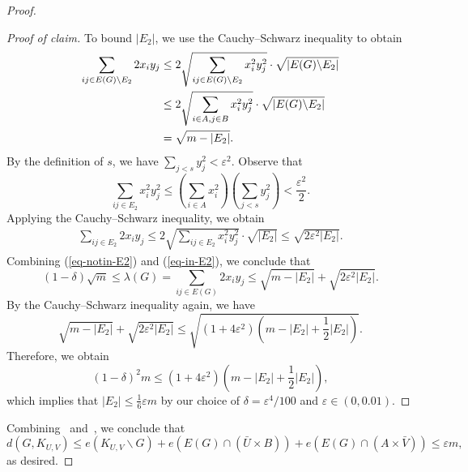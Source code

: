 \documentclass[10pt,a4paper]{amsart}
\newcommand*{\abs}[1]{\lvert#1\rvert}
\newenvironment{poc}{\begin{proof}[Proof of claim]\renewcommand*{\qedsymbol}{$\blacksquare$}}{\end{proof}}
\begin{document}
\begin{proof}
\begin{poc}
        To bound $|E_2|$, we use the Cauchy--Schwarz inequality to obtain
        \begin{align}
       \notag \sum_{ij \in E(G) \backslash E_2} 2x_i y_j  & \leq 2 \sqrt{\sum_{ij \in E(G) \backslash E_2} x_i^2 y_j^2} \cdot \sqrt{ |E(G) \backslash E_2| } \\ 
        & \leq 2 \sqrt{\sum_{i \in A, j \in B} x_i^2 y_j^2} \cdot \sqrt{|E(G) \backslash E_2|} \notag \\
        &= \sqrt{m - |E_2| }. \label{eq-notin-E2}
        \end{align}
        By the definition of $s$, we have $\sum_{j < s} y_j^2 < \varepsilon^2$. Observe that 
        $$\sum_{ij \in E_2} x_i^2 y_j^2 \leq \left(\sum_{i \in A} x_i^2\right) \left( \sum_{j < s} y_j^2 \right) < \frac{\varepsilon^2}{2}.$$
        Applying the Cauchy--Schwarz inequality, we obtain
        \begin{align} \label{eq-in-E2}
        \sum_{ij \in E_2} 2x_i y_j \leq 2 \sqrt{\sum_{ij \in E_2} x_i^2 y_j^2} \cdot \sqrt{\abs{E_2}} \leq \sqrt{2 \varepsilon^2 \abs{E_2}}.
        \end{align}
        Combining (\ref{eq-notin-E2}) and (\ref{eq-in-E2}), we conclude that 
        $$ 
        (1 - \delta) \sqrt{m} \le 
        \lambda(G) = \sum_{ij \in E(G)} 2x_i y_j 
        \le \sqrt{m - \abs{E_2}} + \sqrt{2 \varepsilon^2 \abs{E_2}}.$$
        By the Cauchy--Schwarz inequality again, we have
        $$\sqrt{m - \abs{E_2}} + \sqrt{2 \varepsilon^2 \abs{E_2}} \leq \sqrt{(1 + 4\varepsilon^2) \left(m - \abs{E_2} + \frac{1}{2}\abs{E_2}\right)}.$$
        Therefore, we obtain
        $$ (1 - \delta)^2 m\le 
        (1 + 4\varepsilon^2) \left(m - \abs{E_2} + \frac{1}{2}\abs{E_2} \right), $$
        which implies that $\abs{E_2} \leq \frac{1}{6} \varepsilon m $ by our choice of $\delta = \varepsilon^4 / 100$ and $\varepsilon \in (0, 0.01)$.
    \end{poc}
    Combining~ and~, we conclude that 
    $$d(G, K_{U, V}) \leq e(K_{U, V} \backslash G) + e(E(G) \cap (\bar{U} \times B)) + e(E(G) \cap (A \times \bar{V})) \leq \varepsilon m, $$ 
    as desired.
\end{proof}
\end{document}
